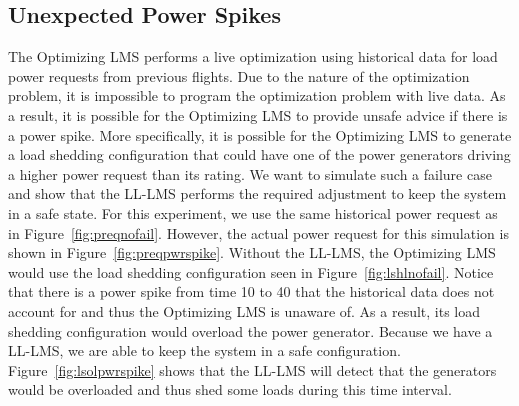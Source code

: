 \documentclass{acm_proc_article-sp}
\begin{document}
\subsection{Unexpected Power Spikes}
The Optimizing LMS performs a live optimization using historical data for load power requests from
previous flights. Due to the nature of the optimization problem, it is impossible to
program the optimization problem with live data. As a result, it is possible for the
Optimizing LMS to provide unsafe advice if there is a power spike. More specifically, it is possible
for the Optimizing LMS to generate a load shedding configuration that could have one of the power
generators driving a higher power request than its rating. We want to simulate such a
failure case and show that the LL-LMS performs the required adjustment to keep the system
in a safe state. For this experiment, we use the same historical power request as in
Figure~\ref{fig:preqnofail}. However, the actual power request for this simulation is shown
in Figure~\ref{fig:preqpwrspike}. Without the LL-LMS, the Optimizing LMS would use the load
shedding configuration seen in Figure~\ref{fig:lshlnofail}. Notice that there is a power
spike from time 10 to 40 that the historical data does not account for and thus the Optimizing LMS
is unaware of. As a result, its load shedding configuration would overload the power
generator. Because we have a LL-LMS, we are able to keep the system in a safe configuration.
Figure~\ref{fig:lsolpwrspike} shows that the LL-LMS will detect that the generators would
be overloaded and thus shed some loads during this time interval.
\end{document}
